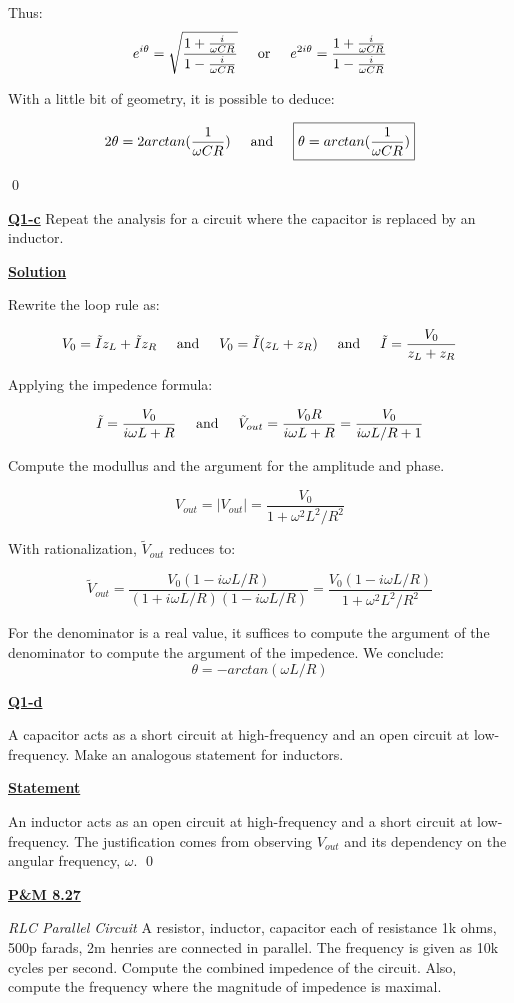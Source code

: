 \documentclass{article}
\newcommand{\new}[1]{
    \vspace{2mm}
    \noindent
    \textbf{
    \underline{#1}}
}
\newcommand{\textOr}{
    {
        \hspace{5mm}
        \textrm{or}
        \hspace{5mm}
    }
}
\newcommand{\textAnd}{
    {
        \hspace{5mm}
        \textrm{and}
        \hspace{5mm}
    }
}
\begin{document}
Thus:
\[
e^{i\theta} 
    = \sqrt{
        \frac{1+\frac{i}{\omega CR}}
    {1-\frac{i}{\omega C R}}
    }
    \textOr
e^{2i\theta} 
    = 
        \frac{1+\frac{i}{\omega CR}}
    {1-\frac{i}{\omega C R}}
\]

With a little bit of geometry, it is possible to deduce:

\[
    2\theta = 2arctan(\frac{1}{\omega CR})
    \textAnd
    \boxed{
    \theta = arctan(\frac{1}{\omega CR})
    }
\]

\qed

\new{Q1-c} Repeat the analysis for a circuit where the 
capacitor is replaced by an inductor. 

\new{Solution}
Rewrite the loop rule as:

\[
    V_0 = \tilde{I}z_{L}+ \tilde{I}z_{R}
    \textAnd 
     V_0 = \tilde{I}(z_L + z_R)
    \textAnd
    \tilde{I} = \frac{V_0}{z_L+z_R}
\]

Applying the impedence formula:

\[
    \tilde{I} = 
    \frac{V_0}
    {i\omega L +R}
    \textAnd
    \tilde{V}_{out} = \frac{V_0R}
    {i\omega L +R}
    = \frac{V_0}{i\omega L/R+1}
\]

Compute the modullus and the argument for the amplitude and 
phase. 

\[
    \boxed{
    V_{out} = |V_{out}| = 
    \frac{V_0}{1+\omega^2L^2/R^2}
    }
\]

With rationalization, $\tilde{V}_{out}$ reduces to:

\[
    \tilde{V}_{out} = \frac{V_0 (1-i\omega L/R)}{(1+i\omega L/R)(1-i\omega L/R)}
    = \frac{V_0(1-i\omega L/R)}{1+\omega^2L^2/R^2}
\]

For the denominator is a real value, it suffices to compute 
the argument of the denominator to compute the argument of the 
impedence. We conclude:
\[
    \boxed{
    \theta = -arctan(\omega L/R)
    }
\]

\new{Q1-d}
A capacitor acts as a short circuit at high-frequency and 
an open circuit at low-frequency. Make an analogous statement 
for inductors.

\new{Statement}
An inductor acts as an open circuit at high-frequency and 
a short circuit at low-frequency. The justification comes 
from observing $V_{out}$ and its dependency on the angular 
frequency, $\omega$. \qed


\newpage
\new{P\&M 8.27}
\textit{RLC Parallel Circuit} A resistor, inductor, capacitor each 
of resistance 1k ohms, 500p farads, 2m henries are connected in 
parallel. The frequency is given as 10k cycles per second. 
Compute the combined impedence of the circuit. Also, compute 
the frequency where the magnitude of impedence is maximal. 
\end{document}
